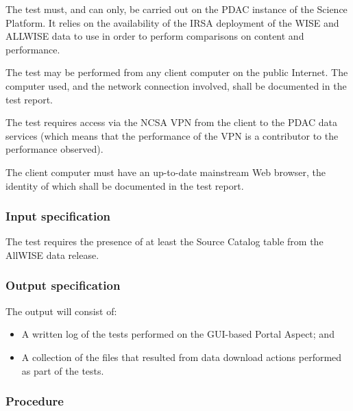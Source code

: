 The test must, and can only, be carried out on the PDAC instance of the Science Platform.
It relies on the availability of the IRSA deployment of the WISE and ALLWISE data to use in order to perform comparisons on content and performance.

The test may be performed from any client computer on the public Internet.
The computer used, and the network connection involved, shall be documented in the test report.

The test requires access via the NCSA VPN from the client to the PDAC data services 
(which means that the performance of the VPN is a contributor to the performance observed).

The client computer must have an up-to-date mainstream Web browser, the identity of which shall be documented in the test report.


\subsubsection{Input specification}

The test requires the presence of at least the Source Catalog table from the AllWISE data release.


\subsubsection{Output specification}

The output will consist of:

\begin{itemize}
  \item{A written log of the tests performed on the GUI-based Portal Aspect; and}
  \item{A collection of the files that resulted from data download actions performed as part of the tests.}
\end{itemize}


\subsubsection{Procedure}

